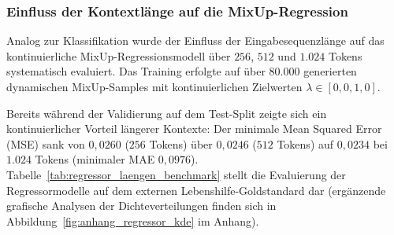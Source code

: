 \subsubsection{Einfluss der Kontextlänge auf die MixUp-Regression}
\label{sec:regressor_laengen_ablation}

Analog zur Klassifikation wurde der Einfluss der Eingabesequenzlänge auf das kontinuierliche MixUp-Regressionsmodell über $256$, $512$ und $1.024$ Tokens systematisch evaluiert. Das Training erfolgte auf über $80.000$ generierten dynamischen MixUp-Samples mit kontinuierlichen Zielwerten $\lambda \in [0{,}0, 1{,}0]$.

Bereits während der Validierung auf dem Test-Split zeigte sich ein kontinuierlicher Vorteil längerer Kontexte: Der minimale Mean Squared Error (MSE) sank von $0{,}0260$ ($256$ Tokens) über $0{,}0246$ ($512$ Tokens) auf $0{,}0234$ bei $1.024$ Tokens (minimaler MAE $0{,}0976$). Tabelle~\ref{tab:regressor_laengen_benchmark} stellt die Evaluierung der Regressormodelle auf dem externen Lebenshilfe-Goldstandard dar (ergänzende grafische Analysen der Dichteverteilungen finden sich in Abbildung~\ref{fig:anhang_regressor_kde} im Anhang).

